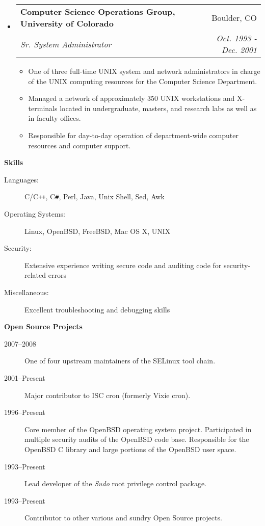 \documentclass[letterpaper,11pt]{article}
\makeatletter
\newcommand{\resitem}[1]{\item #1 \vspace{-2pt}}
\newcommand{\resheading}[1]{{\large \colorbox{mygrey}{\begin{minipage}{\textwidth}{\textbf{#1 \vphantom{p\^{E}}}}\end{minipage}}}}
\newcommand{\ressubheading}[4]{
\begin{tabular*}{7.0in}{l@{\extracolsep{\fill}}r}
		\textbf{#1} & #2 \\
		\textit{#3} & \textit{#4} \\
\end{tabular*}\vspace{-6pt}}
\makeatother
\begin{document}
\begin{itemize}
\item
	\ressubheading{Computer Science Operations Group, University of Colorado}{Boulder, CO}{Sr. System Administrator}{Oct. 1993 - Dec. 2001}
	\begin{itemize}
		\resitem{One of three full-time {\sc UNIX} system and network administrators in charge of the {\sc UNIX} computing resources for the Computer Science Department.}
		\resitem{Managed a network of approximately 350 {\sc UNIX} workstations and X-terminals located in undergraduate, masters, and research labs as well as in faculty offices.}
		\resitem{Responsible for day-to-day operation of department-wide computer resources and computer support.}
	\end{itemize}

\end{itemize}

\resheading{Skills}

\begin{description}
\item[Languages:]
C/C{}\verb!++!, C{}\verb!#!, Perl, Java, Unix Shell, Sed, Awk
\item[Operating Systems:]
Linux, OpenBSD, FreeBSD, Mac OS X, {\sc UNIX}
\item[Security:]
Extensive experience writing secure code and auditing code for security-related errors
\item[Miscellaneous:]
Excellent troubleshooting and debugging skills
\end{description}

\resheading{Open Source Projects}

\begin{description}
\item[2007--2008] One of four upstream maintainers of the SELinux tool chain.
\item[2001--Present] Major contributor to ISC cron (formerly Vixie cron).
\item[1996--Present] Core member of the OpenBSD operating system project.  Participated in multiple security audits of the OpenBSD code base.  Responsible for the OpenBSD C library and large portions of the OpenBSD user space.
\item[1993--Present] Lead developer of the \emph{Sudo} root privilege control package.
\item[1993--Present] Contributor to other various and sundry Open Source projects.
\end{description}

\pagebreak
\end{document}
